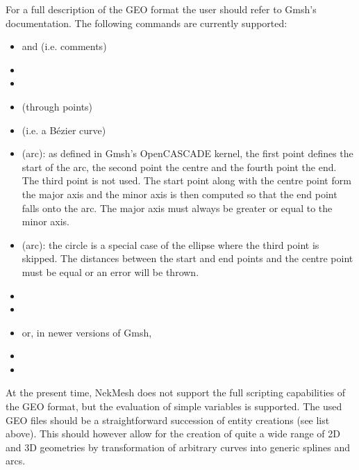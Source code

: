 For a full description of the GEO format the user should refer to Gmsh's
documentation. The following commands are currently supported:
\begin{itemize}
  \item \inltt{//} and \inltt{/* */} (i.e. comments)
  \item {}
  \item {}
  \item {} (through points)
  \item {} (i.e. a B\'{e}zier curve)
  \item {} (arc): as defined in Gmsh's OpenCASCADE kernel, the first
    point defines the start of the arc, the second point the centre and the fourth
    point the end. The third point is not used. The start point along with the centre
    point form the major axis and the minor axis is then computed so that the end
    point falls onto the arc. The major axis must always be greater or equal to the
    minor axis.
  \item {} (arc): the circle is a special case of the ellipse where the
    third point is skipped. The distances between the start and end points and the
    centre point must be equal or an error will be thrown.
  \item {}
  \item {}
  \item {} or, in newer versions of Gmsh, 
  \item {}
  \item {}
\end{itemize}

At the present time, NekMesh does not support the full scripting capabilities of
the GEO format, but the evaluation of simple variables is supported. The used
GEO files should be a straightforward succession of entity creations (see list
above). This should however allow for the creation of quite a wide range of 2D
and 3D geometries by transformation of arbitrary curves into generic splines and
arcs.


